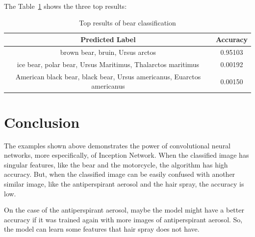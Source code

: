 \documentclass[12pt]{article}
\begin{document}
The Table~\ref{tab:result3} shows the three top results:

\begin{table}[H]
  \centering
  \caption{Top results of bear classification}
  \begin{tabular}{|c|c|}
    \hline
      Predicted Label & Accuracy \\
    \hline
    brown bear, bruin, Ursus arctos & 0.95103 \\
    ice bear, polar bear, Ursus Maritimus, Thalarctos maritimus & 0.00192 \\
    American black bear, black bear, Ursus americanus, Euarctos americanus & 0.00150 \\
    \hline
  \end{tabular}
  \label{tab:result3}
\end{table}

\section{Conclusion}

The examples shown above demonstrates the power of convolutional neural networks, more especifically, of Inception Network. When the classified image has singular features, like the bear and the motorcycle, the algorithm has high accuracy. But, when the classified image can be easily confused with another similar image, like the antiperspirant aerosol and the hair spray, the accuracy is low.

On the case of the antiperspirant aerosol, maybe the model might have a better accuracy if it was trained again with more images of antiperspirant aerosol. So, the model can learn some features that hair spray does not have.



\end{document}
